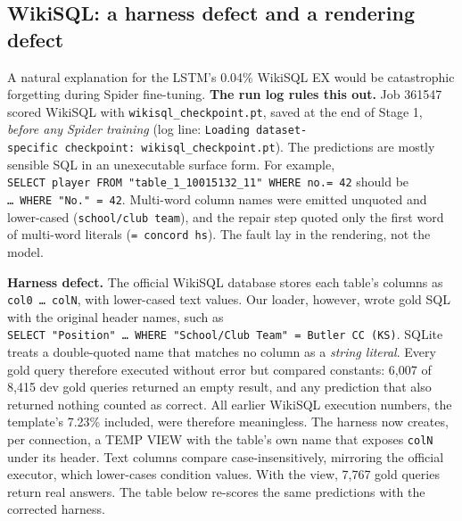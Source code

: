 \documentclass[
  10pt,
]{article}
\begin{document}
\subsection{WikiSQL: a harness defect and a rendering
defect}\label{wikisql-a-harness-defect-and-a-rendering-defect}

A natural explanation for the LSTM's 0.04\% WikiSQL EX would be
catastrophic forgetting during Spider fine-tuning. \textbf{The run log
rules this out.} Job 361547 scored WikiSQL with
\texttt{wikisql\_checkpoint.pt}, saved at the end of Stage 1,
\emph{before any Spider training} (log line:
\texttt{Loading\ dataset-specific\ checkpoint:\ wikisql\_checkpoint.pt}).
The predictions are mostly sensible SQL in an unexecutable surface form.
For example,
\texttt{SELECT\ player\ FROM\ "table\_1\_10015132\_11"\ WHERE\ no.=\ 42}
should be \texttt{…\ WHERE\ "No."\ =\ 42}. Multi-word column names were
emitted unquoted and lower-cased (\texttt{school/club\ team}), and the
repair step quoted only the first word of multi-word literals
(\texttt{=\ \textquotesingle{}concord\textquotesingle{}\ hs}). The fault
lay in the rendering, not the model.

\textbf{Harness defect.} The official WikiSQL database stores each
table's columns as \texttt{col0\ …\ colN}, with lower-cased text values.
Our loader, however, wrote gold SQL with the original header names, such
as
\texttt{SELECT\ "Position"\ …\ WHERE\ "School/Club\ Team"\ =\ \textquotesingle{}Butler\ CC\ (KS)\textquotesingle{}}.
SQLite treats a double-quoted name that matches no column as a
\emph{string literal}. Every gold query therefore executed without error
but compared constants: 6,007 of 8,415 dev gold queries returned an
empty result, and any prediction that also returned nothing counted as
correct. All earlier WikiSQL execution numbers, the template's 7.23\%
included, were therefore meaningless. The harness now creates, per
connection, a TEMP VIEW with the table's own name that exposes
\texttt{colN} under its header. Text columns compare case-insensitively,
mirroring the official executor, which lower-cases condition values.
With the view, 7,767 gold queries return real answers. The table below
re-scores the same predictions with the corrected harness.
\end{document}
